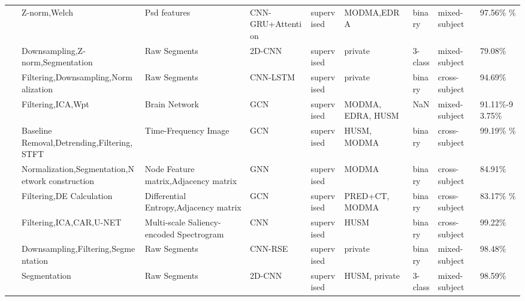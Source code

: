 \begin{table*}[ht]
\begin{tabular}{p{0.4cm}p{2.8cm}p{2cm}p{1.5cm}p{1.9cm}p{1.9cm}p{0.8cm}p{1.8cm}p{2cm}}
~\cite{MDD9} & Z-norm,Welch & Psd features & CNN-GRU+Attention & supervised & MODMA,\newline EDRA & binary & mixed-subject & 97.56\% \newline
98.33\% \\
~\cite{MDD10} & Downsampling,Z-norm,\newline Segmentation & Raw Segments & 2D-CNN & supervised & private & 3-class & mixed-subject & 79.08\% \\
~\cite{MDD11} & Filtering,Downsampling,\newline Normalization & Raw Segments & CNN-LSTM & supervised & private & binary & cross-subject & 94.69\% \\

~\cite{MDD13} & Filtering,ICA,Wpt & Brain Network & GCN & supervised & MODMA, \newline EDRA, \newline HUSM & NaN & mixed-subject & 91.11\%-93.75\% \\
~\cite{MDD14} & Baseline Removal,\newline Detrending,Filtering,STFT & Time-Frequency Image & GCN & supervised & HUSM, \newline MODMA & binary & cross-subject & 99.19\% \newline 95.53\% \\
~\cite{MDD15} & Normalization,\newline Segmentation,Network construction & Node Feature \newline matrix,Adjacency matrix & GNN & supervised & MODMA & binary & cross-subject & 84.91\% \\
~\cite{MDD16} & Filtering,DE Calculation & Differential Entropy,Adjacency matrix & GCN & supervised & PRED+CT, \newline MODMA & binary & cross-subject & 83.17\% \newline 92.87\% \\
~\cite{MDD17} & Filtering,ICA,CAR,\newline U-NET & Multi-scale Saliency-encoded Spectrogram & CNN & supervised & HUSM & binary & cross-subject & 99.22\% \\
~\cite{MDD18} & Downsampling,Filtering,\newline Segmentation & Raw Segments & CNN-RSE & supervised & private & binary & mixed-subject & 98.48\% \\
~\cite{MDD19} & Segmentation & Raw Segments & 2D-CNN & supervised & HUSM, \newline private & 3-class & mixed-subject & 98.59\% \\

\end{tabular}
\end{table*}

